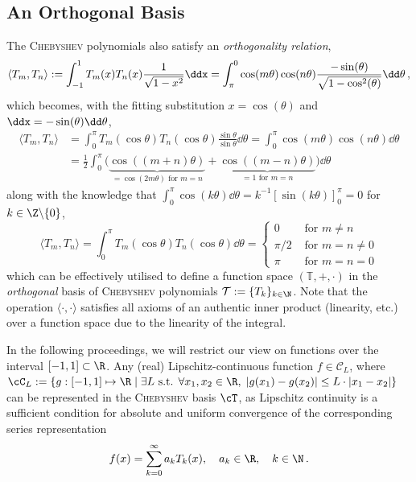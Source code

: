 \documentclass[12pt, a4paper]{article}
\newcommand{\chebyshev}{\textsc{Chebyshev}\xspace}
\begin{document}
  \subsection{An Orthogonal Basis}
  The \chebyshev polynomials also satisfy an \emph{orthogonality relation},
  $$\langle T_m, T_n \rangle := \int_{-1}^1 T_m(x) T_n(x) \frac{1}{\sqrt{1-x^2}} \ddx = \int_{\pi}^{0} \cos(m \theta) \cos(n \theta) \frac{-\sin(\theta)}{\sqrt{1-\cos^2(\theta)}} \dd\theta \,,$$
  which becomes, with the fitting substitution $x = \cos(\theta)$ and $\ddx = -\sin(\theta) \dd\theta$,
  \begin{align*}
    \langle T_m, T_n \rangle & = \int_0^\pi T_m(\cos \theta) T_n(\cos \theta) \frac{\sin \theta}{\sin \theta}\dd\theta = \int_0^\pi \cos(m \theta) \cos(n \theta) \dd\theta                            \\
                             & = \frac{1}{2} \int_0^\pi \big(\underbrace{\cos((m+n) \theta)}_{=\cos(2m\theta) \text{ for } m=n} + \underbrace{\cos((m-n) \theta)}_{=1 \text{ for } m=n}\big) \dd\theta
  \end{align*}
  along with the knowledge that $\int_0^\pi \cos(k \theta) \dd\theta = k^{-1} \left[\sin(k\theta)\right]_0^\pi = 0$ for $k \in \Z \backslash \{0\}$,
  $$\langle T_m, T_n \rangle = \int_0^\pi T_m(\cos \theta) T_n(\cos \theta) \dd\theta = \begin{cases}
      0     & \text{ for } m \neq n     \\
      \pi/2 & \text{ for } m = n \neq 0 \\
      \pi   & \text{ for } m = n = 0
    \end{cases}$$
  which can be effectively utilised to define a function space $(\mathbb{T}, +, \cdot)$ in the \emph{orthogonal} basis of \chebyshev polynomials $\mathcal{T} := \{T_k\}_{k \in \N}$.
  Note that the operation $\langle \cdot, \cdot \rangle$ satisfies all axioms of an authentic inner product (linearity, etc.) over a function space due to the linearity of the integral.

  In the following proceedings, we will restrict our view on functions over the interval $[-1, 1] \subset \R$.
  Any (real) Lipschitz-continuous function $f \in \mathcal{C}_L$, where $\cC_L := \{g: [-1, 1] \mapsto \R \;|\; \exists L \text{ s.t. } \forall x_1, x_2 \in \R, \; |g(x_1) - g(x_2)| \le L \cdot |x_1-x_2|\}$ can be represented in the \chebyshev basis $\cT$, as Lipschitz continuity is a sufficient condition for absolute and uniform convergence of the corresponding series representation
  $$f(x) = \sum_{k=0}^\infty a_k T_k(x), \quad a_k \in \R,\quad k \in \N \,.$$
\end{document}
